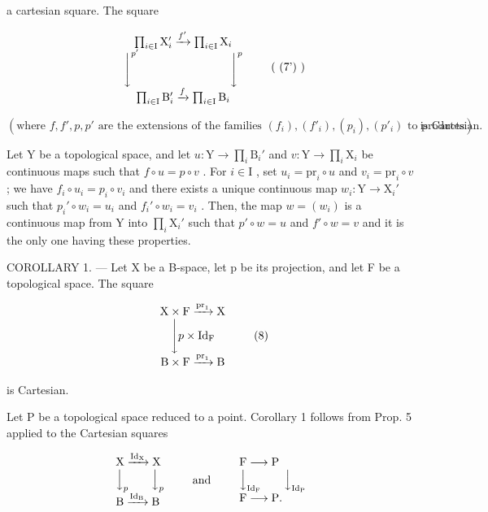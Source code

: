 a cartesian square. The square

\[
\begin{array}{c} \prod_ {i \in \mathrm{I}} \mathrm{X} _ {i} ^ {\prime} \xrightarrow {f ^ {\prime}} \prod_ {i \in \mathrm{I}} \mathrm{X} _ {i} \\ \Biggl \downarrow^ {p ^ {\prime}} \qquad \qquad \qquad \qquad \Biggl \downarrow^ {p} \\ \prod_ {i \in \mathrm{I}} \mathrm{B} _ {i} ^ {\prime} \xrightarrow {f} \prod_ {i \in \mathrm{I}} \mathrm{B} _ {i} \end{array}\tag{ (7') }
\]

\((\text{where } f, f', p, p' \text{ are the extensions of the families } (f_i), (f'_i), (p_i), (p'_i) \text{ to products}) \text{ is Cartesian.}\)

Let Y be a topological space, and let \(u \colon \mathrm{Y} \to \prod_{i} \mathrm{B}_{i}'\) and \(v \colon \mathrm{Y} \to \prod_{i} \mathrm{X}_{i}\) be continuous maps such that \(f \circ u = p \circ v\) . For \(i \in \mathrm{I}\) , set \(u_{i} = \mathrm{pr}_{i} \circ u\) and \(v_{i} = \mathrm{pr}_{i} \circ v\) ; we have \(f_{i} \circ u_{i} = p_{i} \circ v_{i}\) and there exists a unique continuous map \(w_{i} \colon \mathrm{Y} \to \mathrm{X}_{i}'\) such that \(p_{i}' \circ w_{i} = u_{i}\) and \(f_{i}' \circ w_{i} = v_{i}\) . Then, the map \(w = (w_{i})\) is a continuous map from Y into \(\prod_{i} \mathrm{X}_{i}'\) such that \(p' \circ w = u\) and \(f' \circ w = v\) and it is the only one having these properties.

COROLLARY 1. --- Let X be a B-space, let p be its projection, and let F be a topological space. The square

\[
\begin{array}{c} \mathrm{X} \times \mathrm{F} \xrightarrow {\operatorname{pr} _ {1}} \mathrm{X} \\ \Biggl \downarrow p \times \mathrm{Id} _ {\mathrm{F}} \\ \mathrm{B} \times \mathrm{F} \xrightarrow {\operatorname{pr} _ {1}} \mathrm{B} \end{array}\tag{8}
\]

is Cartesian.

Let P be a topological space reduced to a point. Corollary 1 follows from Prop. 5 applied to the Cartesian squares

\[
\begin{array}{l} \mathrm{X} \xrightarrow {\mathrm{Id} _ {\mathrm{X}}} \mathrm{X} \\ \Big \downarrow_ {p} \qquad \Big \downarrow_ {p} \\ \mathrm{B} \xrightarrow {\mathrm{Id} _ {\mathrm{B}}} \mathrm{B} \end{array} \qquad \text {and} \qquad \begin{array}{l} \mathrm{F} \longrightarrow \mathrm{P} \\ \Big \downarrow_ {\mathrm{Id} _ {\mathrm{F}}} \qquad \Big \downarrow_ {\mathrm{Id} _ {\mathrm{P}}} \\ \mathrm{F} \longrightarrow \mathrm{P}. \end{array}
\]

